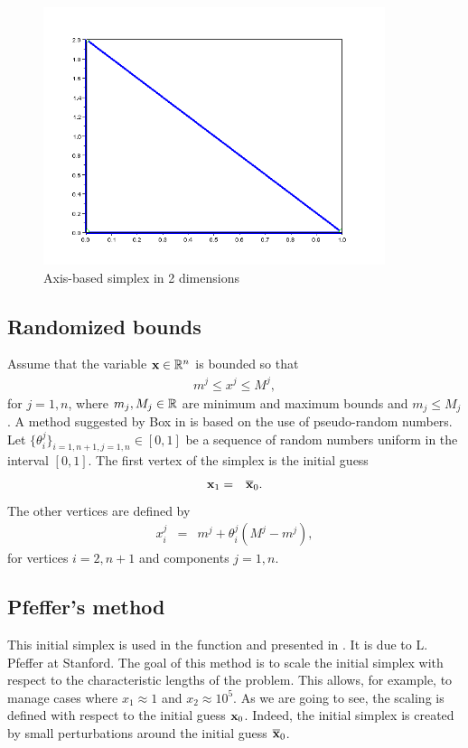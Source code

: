 \begin{figure}
\begin{center}
\includegraphics[width=10cm]{simplex_axes.png}
\end{center}
\caption{Axis-based simplex in 2 dimensions}
\label{fig-nm-simplex-axes}
\end{figure}

\subsection{Randomized bounds}

Assume that the variable $\mathbf{x}\in\mathbb{R}^n$ is bounded so that 
\begin{eqnarray}
m^j \leq x^j \leq M^j,
\end{eqnarray}
for $j=1,n$, where $m_j,M_j\in\mathbb{R}$ are minimum and maximum bounds and $m_j\leq M_j$.
A method suggested by Box in \cite{Box1965} is based on the use of 
pseudo-random numbers. Let $\{\theta_i^j\}_{i=1,n+1,j=1,n}\in[0,1]$ be 
a sequence of random numbers uniform in the interval $[0,1]$.
The first vertex of the simplex is the initial guess 
\begin{eqnarray}
\mathbf{x}_1 &=& \overline{\mathbf{x}}_0.
\end{eqnarray}
The other vertices are defined by 
\begin{eqnarray}
x_i^j &=& m^j + \theta_i^j (M^j - m^j),
\end{eqnarray}
for vertices $i=2,n+1$ and components $j=1,n$.

\subsection{Pfeffer's method}

This initial simplex is used in the function 
and presented in \cite{Fan2002}. It is due to L. Pfeffer at Stanford.
The goal of this method is to scale the initial simplex with respect 
to the characteristic lengths of the problem. This allows, for example,
to manage cases where $x_1\approx 1$ and $x_2\approx 10^5$.
As we are going to see, the scaling is defined with respect to the 
initial guess $\mathbf{x}_0$. Indeed, the initial simplex is created by 
small perturbations around the initial guess $\overline{\mathbf{x}}_0$.

